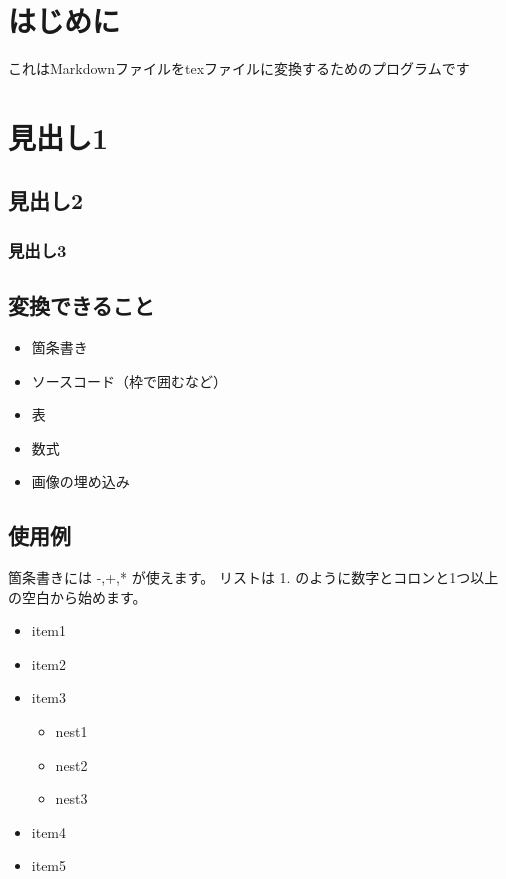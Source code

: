 \documentclass[a4j]{jarticle}
\begin{document}
\section{はじめに}

これはMarkdownファイルをtexファイルに変換するためのプログラムです

\section{見出し1}

\subsection{見出し2}

\subsubsection{見出し3}

\subsection{変換できること}

\begin{itemize}
\item 箇条書き
\item ソースコード（枠で囲むなど）
\item 表
\item 数式
\item 画像の埋め込み
\end{itemize}

\subsection{使用例}

箇条書きには -,+,* が使えます。
リストは 1. のように数字とコロンと1つ以上の空白から始めます。

\begin{itemize}
\item item1
\item item2
\item item3


\begin{itemize}
\item nest1
\item nest2
\item nest3
\end{itemize}
\item item4
\item item5
\end{itemize}
\end{document}
